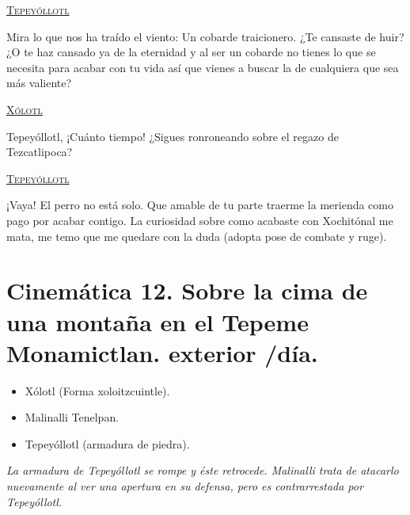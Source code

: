 \documentclass[11pt,letterpaper]{article}
\begin{document}
\begin{center}
\textsc{\underline{Tepeyóllotl}}
\\
\par
Mira lo que nos ha traído el viento: Un cobarde traicionero. ¿Te cansaste de huir? ¿O te haz cansado ya de la eternidad y al ser un cobarde no tienes lo que se necesita para acabar con tu vida así que vienes a buscar la de cualquiera que sea más valiente? 
\\
\par
\textsc{\underline{Xólotl}}
\\
\par
Tepeyóllotl, ¡Cuánto tiempo! ¿Sigues ronroneando sobre el regazo de Tezcatlipoca?
\\
\par
\textsc{\underline{Tepeyóllotl}}
\\
\par
¡Vaya! El perro no está solo. Que amable de tu parte traerme la merienda como pago por acabar contigo. La curiosidad sobre como acabaste con Xochitónal me mata, me temo que me quedare con la duda (adopta pose de combate y ruge). 
\end{center}

\section{Cinemática 12. Sobre la cima de una montaña en el Tepeme Monamictlan. exterior /día.}
\textsc{\underline{ }}
\begin{itemize}
\item Xólotl (Forma xoloitzcuintle).
\item Malinalli Tenelpan.
\item Tepeyóllotl (armadura de piedra).
\end{itemize}
\textit{La armadura de Tepeyóllotl se rompe y éste retrocede. Malinalli trata de atacarlo nuevamente al ver una apertura en su defensa, pero es contrarrestada por Tepeyóllotl.}
\end{document}
